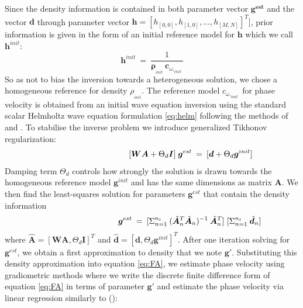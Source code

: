 \documentclass{article}
\begin{document}
	Since the density information is contained in both parameter vector $\mathbf{g^{est}}$ and the vector $\mathbf{d}$ through parameter vector $\mathbf{h}= [h_{[0,0]}, h_{[1,0]},..., h_{[M,N]}]^{T}]$, prior information is given in the form of an initial reference model for $\mathbf{h}$ which we call  $\mathbf{h}^{init}$:
	\begin{equation}
		\mathbf{h}^{init} \: = \: \frac{1}{\bm{\rho}_{ _{init}} \: \bm{c}_{\omega,_{ init}} }
	\end{equation}
	So as not to bias the inversion towards a heterogeneous solution, we chose a homogeneous reference for density $\rho_{ _{init}}$. The reference model  $c_{\omega,_{ init}}$ for phase velocity is obtained from an initial wave equation inversion using the standard scalar Helmholtz wave equation formulation \eqref{eq:helm} following the methods of \textcite{de2015near} and \textcite{cao2020near}. 
	To stabilise the inverse problem we introduce generalized Tikhonov regularization:
	\begin{align}
	\shoveright \shoveright \shoveright \shoveright  \shoveright \shoveright \shoveright \shoveright \shoveright \shoveright
	\: \:	[\bm{W} \bm{A} + \Theta_{d} \bm{I}] \; \bm{g}^{est} &\: = \: [\bm{d} + \Theta_{d} \bm{g}^{init}]
	\end{align}
	Damping term $\Theta_{d}$ controls how strongly the solution is drawn towards the homogeneous reference model $\bm{g}^{init}$ and has the same dimensions as matrix $\bm{A}$. We then find the least-squares solution for parameters $\bm{g}^{est}$ that contain the density information
	\begin{align} \label{eq:regul}
		\shoveright \shoveright \shoveright \shoveright  \shoveright \shoveright \shoveright \shoveright \shoveright \shoveright
		\: \:	\bm{g}^{est} &\: = \: [ \Sigma_{n=1}^{n_{t}} \: (\hat{\bm{A}}_{n}^{T}\hat{\bm{A}}_{n})^{-1} \: \hat{\bm{A}}_{n}^{T} ] \; [ \Sigma_{n=1}^{n_{t}} \: \hat{\bm{d}}_{n}] \:
	\end{align}
	where $\hat{\bm{A}} = [\bm{W}\bm{A}, \Theta_{d} \bm{I}]^{T}$ and $\hat{\bm{d}} = [\bm{d}, \Theta_{d} \bm{g}^{init}]^{T}$.
	After one iteration solving for $\bm{g}^{est}$, we obtain a first approximation to density that we note $\bm{g}'$. Substituting this density approximation into equation \eqref{eq:FA}, we estimate phase velocity using gradiometric methods where we write the discrete finite difference form of equation \eqref{eq:FA} in terms of parameter $\bm{g}'$ and estimate the phase velocity via linear regression similarly to (\cite{de2015near}):
\end{document}
